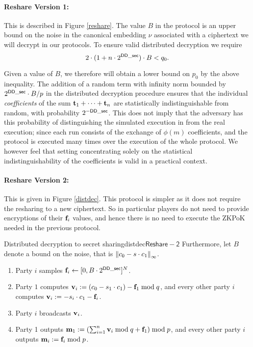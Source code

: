 \paragraph{Reshare Version 1:}
This is described in Figure \ref{reshare}.
The value $B$ in the protocol is an upper bound on the noise in the canonical embedding
$\nu$ associated with a ciphertext we will decrypt in our protocols.
To ensure valid distributed decryption we require
\[ 2 \cdot (1+n \cdot 2^{\mathsf{DD\_sec}}) \cdot B < q_{0}. \]

Given a value of $B$, we therefore will obtain a lower bound
on $p_0$ by the above inequality.
The addition of a random term with infinity norm bounded by
$2^{\mathsf{DD\_sec}} \cdot B/p$ in the distributed decryption procedure
ensures that the individual {\em coefficients} of the sum
$\mathbf{t}_1+\cdots+\mathbf{t}_n$ are statistically indistinguishable from
random, with probability $2^{-\mathsf{DD\_sec}}$.
This does not imply that the adversary has this probability of
distinguishing the simulated execution in \cite{SPDZ} from the
real execution; since each run consists of the exchange of 
$\phi(m)$ coefficients, and the protocol is executed many times
over the execution of the whole protocol.
We however feel that setting concentrating solely on the
statistical indistinguishability of the coefficients is valid 
in a practical context.

\paragraph{Reshare Version 2:}
This is given in Figure \ref{distdec}.
This protocol is simpler as it does not require the resharing to a 
new ciphertext.
So in particular players do not need to provide encryptions of
their $\mathbf{f}_i$ values, and hence there is no need
to execute the ZKPoK needed in the previous protocol.

\begin{Boxfig}{Distributed decryption to secret
    sharing}{distdec}{$\mathsf{Reshare-2}$}
Furthermore, let $B$ denote a bound on the noise, that is ${\Vert c_0 - s \cdot c_1 \Vert}_\infty$.
\begin{enumerate}
\item Party $i$ samples $\mathbf{f}_i \leftarrow [0,B\cdot 2^{\mathsf{DD\_sec}}]^N$.
\item Party $1$ computes
  $\mathbf{v}_i := (c_0 - s_1 \cdot c_1) - \mathbf{f}_1 \bmod q$, and every other
  party $i$ computes $\mathbf{v}_i :=  -s_i \cdot c_1- \mathbf{f}_i$.
\item Party $i$ broadcasts $\mathbf{v}_i$.
\item Party 1 outputs
  $\mathbf{m}_1 := (\sum_{i=1}^n \mathbf{v}_i \bmod q + \mathbf{f}_1) \bmod p$, and
  every other party $i$ outputs $\mathbf{m}_i := \mathbf{f}_i \bmod p$.
\end{enumerate}
\end{Boxfig}





